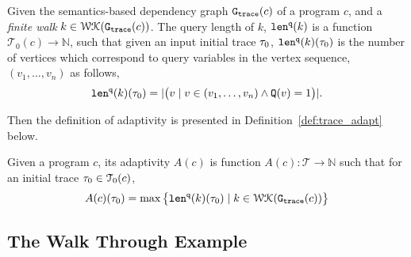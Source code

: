 \begin{defn}
\label{def:qlen}
Given 
the semantics-based dependency graph $\mathtt{{G_{trace}}}({c})$ of a program $c$,
 and a \emph{finite walk} 
 $k \in \mathcal{WK}(\mathtt{{G_{trace}}}(c))$. 
The query length of $k$, $\mathtt{len}^{\tt q}(k)$ is a function $\mathcal{T}_0(c) \to \mathbb{N}$, such that given an input initial trace $\mathtt{\tau}_0$, $\mathtt{len}^{\tt q}(k)(\mathtt{\tau}_0)$ is
the number of vertices which correspond to query variables in the vertex sequence, $(v_1, \ldots, v_{n})$ as follows, 
\[
  \mathtt{len}^{\tt q}(k)(\mathtt{\tau}_0) = |\big( v \mid v \in (v_1, \ldots, v_{n}) \land \mathtt{Q}(v) = 1 \big)|.
\]
\end{defn}
Then the definition of adaptivity is presented in Definition~\ref{def:trace_adapt} below.
\begin{defn}
    \label{def:trace_adapt}
    Given a program ${c}$, 
    its adaptivity $A(c)$ is function 
    $A(c) : \mathcal{T} \to \mathbb{N}$ such that for an
    initial trace $\mathtt{\tau}_0 \in \mathcal{T}_0(c)$, 
   $$
    A(c)(\mathtt{\tau}_0) = \max \big 
    \{ \mathtt{len}^{\tt q}(k)(\mathtt{\tau}_0) \mid k \in \mathcal{WK}(\mathtt{{G_{trace}}}(c)) \big \} $$
    \end{defn}

\subsection{The Walk Through Example}
